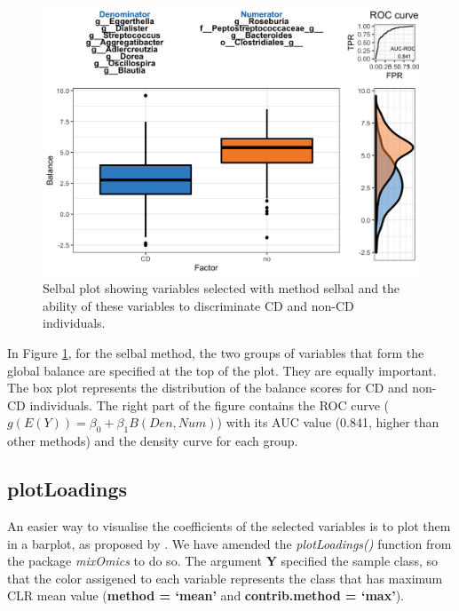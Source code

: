 \documentclass[openany]{book}
\begin{document}
\begin{figure}

{\centering \includegraphics[width=1\linewidth]{./Generated_plots/selbalCD-1} 

}

\caption{Selbal plot showing variables selected with method selbal and the ability of these variables to discriminate CD and non-CD individuals.}\label{fig:selbalCD}
\end{figure}

In Figure \ref{fig:selbalCD}, for the selbal method, the two groups of
variables that form the global balance are specified at the top of the
plot. They are equally important. The box plot represents the
distribution of the balance scores for CD and non-CD individuals. The
right part of the figure contains the ROC curve
(\(g(E(Y)) = \beta_{0} + \beta_{1}B(Den,Num)\)) with its AUC value
(0.841, higher than other methods) and the density curve for each group.

\subsection{plotLoadings}\label{plotloadings}

An easier way to visualise the coefficients of the selected variables is
to plot them in a barplot, as proposed by \citet{rohart2017mint}. We
have amended the \emph{plotLoadings()} function from the package
\emph{mixOmics} to do so. The argument \textbf{Y} specified the sample
class, so that the color assigened to each variable represents the class
that has maximum CLR mean value (\textbf{method = `mean'} and
\textbf{contrib.method = `max'}).
\end{document}
